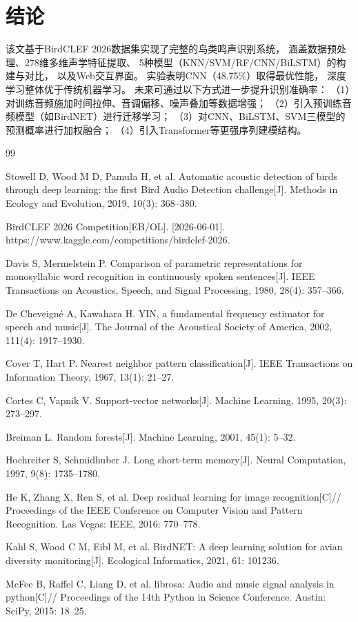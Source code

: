 \documentclass[10pt,twoside,twocolumn]{article}
\begin{document}
\section{结论}

该文基于BirdCLEF 2026数据集实现了完整的鸟类鸣声识别系统，
涵盖数据预处理、278维多维声学特征提取、
5种模型（KNN/SVM/RF/CNN/BiLSTM）的构建与对比，
以及Web交互界面。
实验表明CNN（48.75\%）取得最优性能，
深度学习整体优于传统机器学习。
未来可通过以下方式进一步提升识别准确率：
（1）对训练音频施加时间拉伸、音调偏移、噪声叠加等数据增强；
（2）引入预训练音频模型（如BirdNET\cite{kahl2021}）进行迁移学习；
（3）对CNN、BiLSTM、SVM三模型的预测概率进行加权融合；
（4）引入Transformer等更强序列建模结构。

\begin{thebibliography}{99}

Stowell D, Wood M D, Pamuła H, et al.
Automatic acoustic detection of birds through deep learning:
the first Bird Audio Detection challenge[J].
Methods in Ecology and Evolution, 2019, 10(3): 368--380.

BirdCLEF 2026 Competition[EB/OL].
[2026-06-01].
https://www.kaggle.com/competitions/birdclef-2026.

Davis S, Mermelstein P.
Comparison of parametric representations for monosyllabic word recognition
in continuously spoken sentences[J].
IEEE Transactions on Acoustics, Speech, and Signal Processing,
1980, 28(4): 357--366.

De Cheveigné A, Kawahara H.
YIN, a fundamental frequency estimator for speech and music[J].
The Journal of the Acoustical Society of America,
2002, 111(4): 1917--1930.

Cover T, Hart P.
Nearest neighbor pattern classification[J].
IEEE Transactions on Information Theory, 1967, 13(1): 21--27.

Cortes C, Vapnik V.
Support-vector networks[J].
Machine Learning, 1995, 20(3): 273--297.

Breiman L. Random forests[J].
Machine Learning, 2001, 45(1): 5--32.

Hochreiter S, Schmidhuber J.
Long short-term memory[J].
Neural Computation, 1997, 9(8): 1735--1780.

He K, Zhang X, Ren S, et al.
Deep residual learning for image recognition[C]//
Proceedings of the IEEE Conference on Computer Vision
and Pattern Recognition. Las Vegas: IEEE, 2016: 770--778.

Kahl S, Wood C M, Eibl M, et al.
BirdNET: A deep learning solution for avian diversity monitoring[J].
Ecological Informatics, 2021, 61: 101236.

McFee B, Raffel C, Liang D, et al.
librosa: Audio and music signal analysis in python[C]//
Proceedings of the 14th Python in Science Conference.
Austin: SciPy, 2015: 18--25.

\end{thebibliography}
\end{document}
